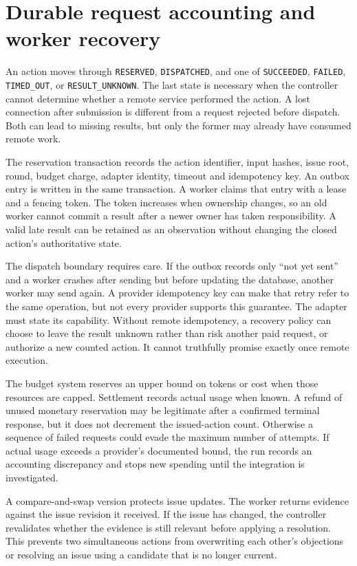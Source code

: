 \documentclass[12pt,a4paper,oneside,openany]{book}
\begin{document}
\section{Durable request accounting and worker recovery}

An action moves through \texttt{RESERVED}, \texttt{DISPATCHED}, and one of
\texttt{SUCCEEDED}, \texttt{FAILED}, \texttt{TIMED\_OUT}, or
\texttt{RESULT\_UNKNOWN}. The last state is necessary when the controller cannot
determine whether a remote service performed the action. A lost connection after
submission is different from a request rejected before dispatch. Both can lead
to missing results, but only the former may already have consumed remote work.

The reservation transaction records the action identifier, input hashes, issue
root, round, budget charge, adapter identity, timeout and idempotency key. An
outbox entry is written in the same transaction. A worker claims that entry with
a lease and a fencing token. The token increases when ownership changes, so an
old worker cannot commit a result after a newer owner has taken responsibility.
A valid late result can be retained as an observation without changing the closed
action's authoritative state.

The dispatch boundary requires care. If the outbox records only ``not yet sent''
and a worker crashes after sending but before updating the database, another
worker may send again. A provider idempotency key can make that retry refer to the
same operation, but not every provider supports this guarantee. The adapter must
state its capability. Without remote idempotency, a recovery policy can choose to
leave the result unknown rather than risk another paid request, or authorize a
new counted action. It cannot truthfully promise exactly once remote execution.

The budget system reserves an upper bound on tokens or cost when those resources
are capped. Settlement records actual usage when known. A refund of unused
monetary reservation may be legitimate after a confirmed terminal response, but
it does not decrement the issued-action count. Otherwise a sequence of failed
requests could evade the maximum number of attempts. If actual usage exceeds a
provider's documented bound, the run records an accounting discrepancy and stops
new spending until the integration is investigated.

A compare-and-swap version protects issue updates. The worker returns evidence
against the issue revision it received. If the issue has changed, the controller
revalidates whether the evidence is still relevant before applying a resolution.
This prevents two simultaneous actions from overwriting each other's objections
or resolving an issue using a candidate that is no longer current.
\end{document}
